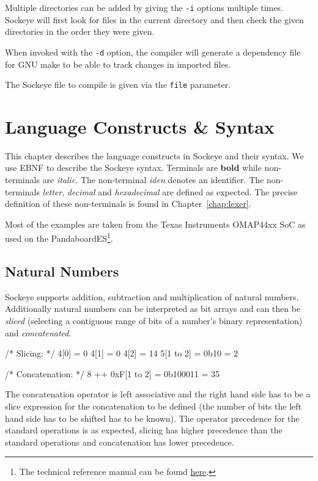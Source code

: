 \documentclass[a4paper,11pt,twoside]{report}
\begin{document}
{{{Multiple directories can be added by giving the \texttt{-i} options multiple times.
Sockeye will first look for files in the current directory and then check the given directories in the order they were given.

When invoked with the \texttt{-d} option, the compiler will generate a dependency file for GNU make to be able to track changes in imported files.

The Sockeye file to compile is given via the \texttt{file} parameter.


\chapter{Language Constructs \& Syntax}
\label{chap:syntax}
This chapter describes the language constructs in Sockeye and their syntax.
We use EBNF to describe the Sockeye syntax. Terminals are \textbf{bold} while non-terminals are \textit{italic}.
The non-terminal \textit{iden} denotes an identifier.
The non-terminals \textit{letter}, \textit{decimal} and \textit{hexadecimal} are defined as expected.
The precise definition of these non-terminals is found in Chapter~\ref{chap:lexer}.

Most of the examples are taken from the Texas Instruments OMAP44xx SoC as used on the PandaboardES\footnote{The technical reference manual can be found \href{http://www.ti.com/lit/ug/swpu235ab/swpu235ab.pdf}{here}.}.

\section{Natural Numbers}
Sockeye supports addition, subtraction and multiplication of natural numbers.
Additionally natural numbers can be interpreted as bit arrays and can then be \emph{sliced} (selecting a contiguous range of bits of a number's binary representation) and \emph{concatenated}.
\begin{example}
  /* Slicing: */
  4[0] = 0
  4[1] = 0
  4[2] = 14
  5[1 to 2] = 0b10 = 2

  /* Concatenation: */
  8 ++ 0xF[1 to 2] = 0b100011 = 35
\end{example}

The concatenation operator is left associative and the right hand side has to be a slice expression for the concatenation to be defined (the number of bits the left hand side has to be shifted has to be known). The operator precedence for the standard operations is as expected, slicing has higher precedence than the standard operations and concatenation has lower precedence.

}}}
\end{document}
